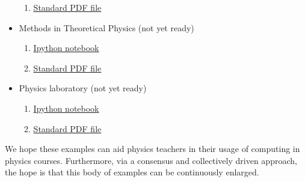 \documentclass[%
oneside,                 %
final,                   %
10pt]{article}
\begin{document}
\begin{itemize}
\begin{enumerate}
  \item \href{{https://github.com/CompPhysics/PAComputationsMSU/tree/master/doc/pub/StatPhys/pdf/StatPhys-minted.pdf}}{Standard PDF file}

\end{enumerate}

\noindent
\item Methods in Theoretical Physics (not yet ready)
\begin{enumerate}

  \item \href{{https://github.com/CompPhysics/PAComputationsMSU/tree/master/doc/pub/}}{Ipython notebook}

  \item \href{{https://github.com/CompPhysics/PAComputationsMSU/tree/master/doc/pub/}}{Standard PDF file}

\end{enumerate}

\noindent
\item Physics laboratory (not yet ready)
\begin{enumerate}

  \item \href{{https://github.com/CompPhysics/PAComputationsMSU/tree/master/doc/pub/}}{Ipython notebook}

  \item \href{{https://github.com/CompPhysics/PAComputationsMSU/tree/master/doc/pub/}}{Standard PDF file}
\end{enumerate}

\noindent
\end{itemize}

\noindent
We hope these examples can aid physics teachers in their usage of computing in physics courses. Furthermore, via a consensus and collectively driven approach, the hope is that this body of examples can be continuously enlarged.
\end{document}

